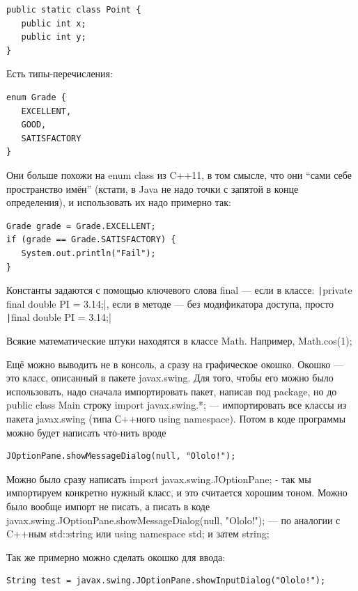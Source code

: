 \documentclass[a5paper]{article}
\begin{document}
\begin{verbatim}
public static class Point {
   public int x;
   public int y;
}
\end{verbatim}

Есть типы-перечисления:

\begin{verbatim}
enum Grade {
   EXCELLENT,
   GOOD,
   SATISFACTORY
}
\end{verbatim}

Они больше похожи на enum class из C++11, в том смысле, что они ``сами себе пространство имён'' (кстати, в Java не надо точки с запятой в конце определения), и использовать их надо примерно так:

\begin{verbatim}
Grade grade = Grade.EXCELLENT;
if (grade == Grade.SATISFACTORY) {
   System.out.println("Fail");
}
\end{verbatim}

Константы задаются с помощью ключевого слова final --- если в классе: \texttt|private final double PI = 3.14;|, если в методе --- без модификатора доступа, просто \texttt|final double PI = 3.14;|

Всякие математические штуки находятся в классе Math. Например, Math.cos(1);

Ещё можно выводить не в консоль, а сразу на графическое окошко. Окошко --- это класс, описанный в пакете javax.swing. Для того, чтобы его можно было использовать, надо сначала импортировать пакет, написав под package, но до public class Main строку import javax.swing.*; --- импортировать все классы из пакета javax.swing (типа С++ного using namespace). Потом в коде программы можно будет написать что-нить вроде

\begin{verbatim}
JOptionPane.showMessageDialog(null, "Ololo!");
\end{verbatim}

Можно было сразу написать import javax.swing.JOptionPane; - так мы импортируем конкретно нужный класс, и это считается хорошим тоном. Можно было вообще импорт не писать, а писать в коде javax.swing.JOptionPane.showMessageDialog(null, "Ololo!");  --- по аналогии с C++ным std::string или using namespace std; и затем string;

Так же примерно можно сделать окошко для ввода:

\begin{verbatim}
String test = javax.swing.JOptionPane.showInputDialog("Ololo!");
\end{verbatim}
\end{document}
